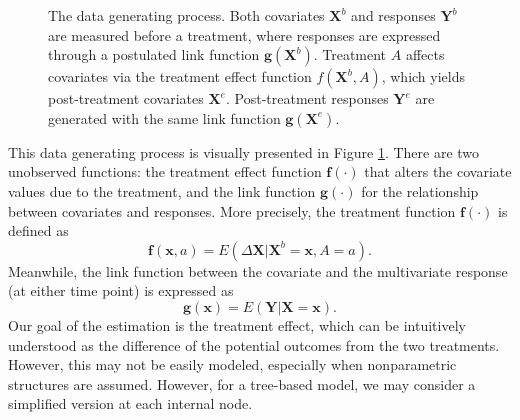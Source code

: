 \documentclass[smallextended]{svjour3}
\begin{document}
\begin{figure}[!h]
    \centering
    \caption{The data generating process. Both covariates $\bm X^b$ and responses $\bm Y^b$ are measured before a treatment, where responses are expressed through a postulated link function $\bm g(\bm X^b)$. Treatment $A$ affects covariates via the treatment effect function $f(\bm X^b, A)$, which yields post-treatment covariates $\bm X^e$. Post-treatment responses $\bm Y^e$ are generated with the same link function $\bm g(\bm X^e)$.}\label{fig1}
\end{figure}

This data generating process is visually presented in Figure \ref{fig1}. There are two unobserved functions: the treatment effect function $\bm f(\cdot)$ that alters the covariate values due to the treatment, and the link function $\bm g(\cdot)$ for the relationship between covariates and responses. More precisely, the treatment function $\bm f(\cdot)$ is defined as 
$$\bm f(\bm x,a) = E(\Delta \bm X | \bm X^b=\bm x,A=a).$$
Meanwhile, the link function between the covariate and the multivariate response (at either time point) is expressed as 
$$\bm g(\bm x) = E(\bm Y |  \bm X = \bm x).$$
Our goal of the estimation is the treatment effect, which can be intuitively understood as the difference of the potential outcomes \citep{rubin1974estimating} from the two treatments. However, this may not be easily modeled, especially when nonparametric structures are assumed. However, for a tree-based model, we may consider a simplified version at each internal node. 
\end{document}
